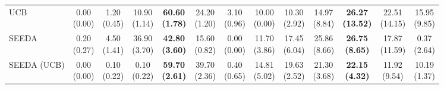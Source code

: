\begin{table}[H]
{\begin{tabular}{l|cccccc|cccccc}
UCB & \makecell{0.00 \\ (0.00)} & \makecell{1.20 \\ (0.45)} & {\cellcolor[HTML]{C8E6C9}} \makecell{10.90 \\ (1.14)} & \bfseries \makecell{60.60 \\ (1.78)} & \makecell{24.20 \\ (1.20)} & \makecell{3.10 \\ (0.96)} & \makecell{10.00 \\ (0.00)} & \makecell{10.30 \\ (2.92)} & {\cellcolor[HTML]{C8E6C9}} \makecell{14.97 \\ (8.84)} & \bfseries \makecell{26.27 \\ (13.52)} & \makecell{22.51 \\ (14.15)} & \makecell{15.95 \\ (9.85)} \\
SEEDA & \makecell{0.20 \\ (0.27)} & \makecell{4.50 \\ (1.41)} & {\cellcolor[HTML]{C8E6C9}} \makecell{36.90 \\ (3.70)} & \bfseries \makecell{42.80 \\ (3.60)} & \makecell{15.60 \\ (0.82)} & \makecell{0.00 \\ (0.00)} & \makecell{11.70 \\ (3.86)} & \makecell{17.45 \\ (6.04)} & {\cellcolor[HTML]{C8E6C9}} \makecell{25.86 \\ (8.66)} & \bfseries \makecell{26.75 \\ (8.65)} & \makecell{17.87 \\ (11.59)} & \makecell{0.37 \\ (2.64)} \\
SEEDA (UCB) & \makecell{0.00 \\ (0.00)} & \makecell{0.10 \\ (0.22)} & {\cellcolor[HTML]{C8E6C9}} \makecell{0.10 \\ (0.22)} & \bfseries \makecell{59.70 \\ (2.61)} & \makecell{39.70 \\ (2.36)} & \makecell{0.40 \\ (0.65)} & \makecell{14.81 \\ (5.02)} & \makecell{19.63 \\ (2.52)} & {\cellcolor[HTML]{C8E6C9}} \makecell{21.30 \\ (3.68)} & \bfseries \makecell{22.15 \\ (4.32)} & \makecell{11.92 \\ (9.54)} & \makecell{10.19 \\ (1.37)} \\

\end{tabular}}
\end{table}
